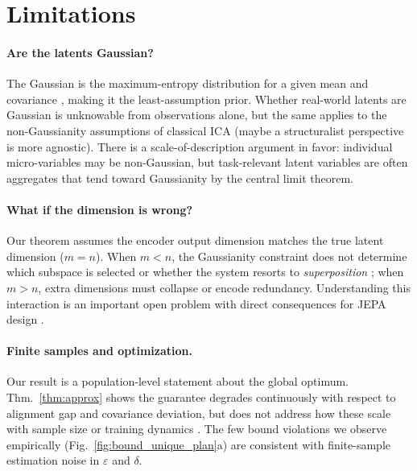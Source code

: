 \documentclass{article}
\begin{document}

\section{Limitations}\label{sec:limitations}

\paragraph{Are the latents Gaussian?}
The Gaussian is the maximum-entropy distribution for a given mean and covariance \citep{jaynes1957information}, making it the least-assumption prior. Whether real-world latents are Gaussian is unknowable from observations alone, but the same applies to the non-Gaussianity assumptions of classical ICA \citep{comon1994} (maybe a structuralist perspective \citep{joshi2026causality} is more agnostic). There is a scale-of-description argument in favor: individual micro-variables may be non-Gaussian, but task-relevant latent variables are often aggregates that tend toward Gaussianity by the central limit theorem.
\paragraph{What if the dimension is wrong?} 
Our theorem assumes the encoder output dimension matches the true latent dimension ($m = n$). When $m < n$, the Gaussianity constraint does not determine which subspace is selected or whether the system resorts to \textit{superposition} \citep{smolensky_tensor_1990, elhage_toy_2022, klindt2025superposition}; when $m > n$, extra dimensions must collapse or encode redundancy. Understanding this interaction is an important open problem with direct consequences for JEPA design \citep{klindt2025superposition}.
\paragraph{Finite samples and optimization.} 
Our result is a population-level statement about the global optimum. Thm.~\ref{thm:approx} shows the guarantee degrades continuously with respect to alignment gap and covariance deviation, but does not address how these scale with sample size \citep{lyu2022finite} or training dynamics \citep{simon2023stepwise}. The few bound violations we observe empirically (Fig.~\ref{fig:bound_unique_plan}a) are consistent with finite-sample estimation noise in $\varepsilon$ and $\delta$.
 
\end{document}

